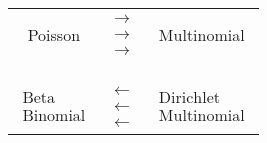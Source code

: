 \documentclass[ xcolor = pdftex, dvipsnames, table ]{beamer}
\begin{document}
\begin{frame}
{\begin{minipage}{0.39\textwidth}
	\begin{tabular}{c c c}
        Poisson 		    	    	  & $\substack{\rightarrow\\\rightarrow\\\rightarrow}$ 	    & Multinomial \\
	\\
        	    	  	    	          &                       		                    & \scalebox{1.5}{$\downarrow$}\\
	\\
        $\substack{\text{Beta}\\\text{Binomial}}$ & $\substack{\leftarrow\\\leftarrow\\\leftarrow}$ & $\substack{\text{Dirichlet}\\\text{Multinomial}}$%
	\end{tabular}
\end{minipage}
}
\end{frame}

%
%
\end{document}
